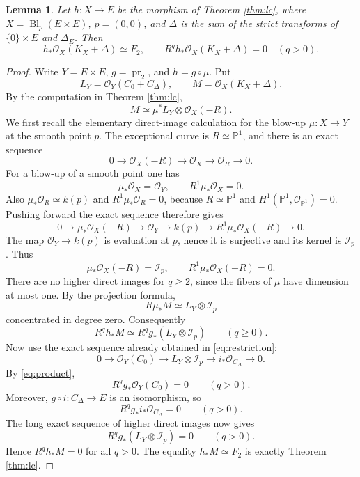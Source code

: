 \documentclass[11pt,letterpaper]{article}
\theoremstyle{paper}
\newtheorem{lemma}[theorem]{Lemma}
\newcommand{\OO}{\mathcal O}
\newcommand{\II}{\mathcal I}
\newcommand{\PP}{\mathbb P}
\DeclareMathOperator{\pr}{pr}
\DeclareMathOperator{\Bl}{Bl}
\begin{document}
\begin{lemma}\label{lem:vanishing}
Let $h:X\to E$ be the morphism of Theorem \ref{thm:lc}, where $X=\Bl_p(E\times E)$, $p=(0,0)$, and $\Delta$ is the sum of the strict transforms of $\{0\}\times E$ and $\Delta_E$. Then
\[
h_*\OO_X(K_X+\Delta)\simeq F_2,\qquad R^qh_*\OO_X(K_X+\Delta)=0\quad(q>0).
\]
\end{lemma}
\begin{proof}
Write $Y=E\times E$, $g=\pr_2$, and $h=g\circ\mu$. Put
\[
L_Y=\OO_Y(C_0+C_\Delta),\qquad M=\OO_X(K_X+\Delta).
\]
By the computation in Theorem \ref{thm:lc},
\[
M\simeq\mu^*L_Y\otimes\OO_X(-R).
\]
We first recall the elementary direct-image calculation for the blow-up $\mu:X\to Y$ at the smooth point $p$. The exceptional curve is $R\simeq\PP^1$, and there is an exact sequence
\[
0\longrightarrow\OO_X(-R)\longrightarrow\OO_X\longrightarrow\OO_R\longrightarrow0.
\]
For a blow-up of a smooth point one has
\[
\mu_*\OO_X=\OO_Y,\qquad R^1\mu_*\OO_X=0.
\]
Also $\mu_*\OO_R\simeq k(p)$ and $R^1\mu_*\OO_R=0$, because $R\simeq\PP^1$ and $H^1(\PP^1,\OO_{\PP^1})=0$. Pushing forward the exact sequence therefore gives
\[
0\longrightarrow\mu_*\OO_X(-R)\longrightarrow\OO_Y\longrightarrow k(p)
\longrightarrow R^1\mu_*\OO_X(-R)\longrightarrow0.
\]
The map $\OO_Y\to k(p)$ is evaluation at $p$, hence it is surjective and its kernel is $\II_p$. Thus
\[
\mu_*\OO_X(-R)=\II_p,\qquad R^1\mu_*\OO_X(-R)=0.
\]
There are no higher direct images for $q\ge2$, since the fibers of $\mu$ have dimension at most one. By the projection formula,
\[
R\mu_*M\simeq L_Y\otimes\II_p
\]
concentrated in degree zero. Consequently
\[
R^qh_*M\simeq R^qg_*(L_Y\otimes\II_p)\qquad(q\ge0).
\]
Now use the exact sequence already obtained in \eqref{eq:restriction}:
\[
0\longrightarrow\OO_Y(C_0)\longrightarrow L_Y\otimes\II_p\longrightarrow i_*\OO_{C_\Delta}\longrightarrow0.
\]
By \eqref{eq:product},
\[
R^qg_*\OO_Y(C_0)=0\qquad(q>0).
\]
Moreover, $g\circ i:C_\Delta\to E$ is an isomorphism, so
\[
R^qg_*i_*\OO_{C_\Delta}=0\qquad(q>0).
\]
The long exact sequence of higher direct images now gives
\[
R^qg_*(L_Y\otimes\II_p)=0\qquad(q>0).
\]
Hence $R^qh_*M=0$ for all $q>0$. The equality $h_*M\simeq F_2$ is exactly Theorem \ref{thm:lc}.
\end{proof}
\end{document}
